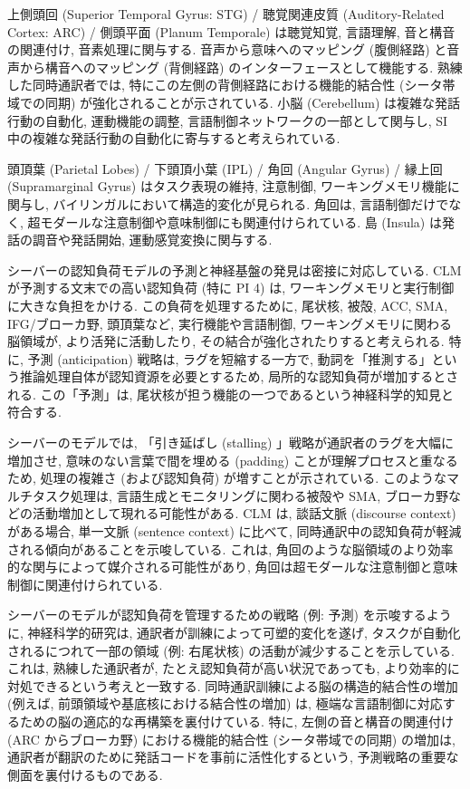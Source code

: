上側頭回 (Superior Temporal Gyrus: STG) / 聴覚関連皮質 (Auditory-Related Cortex: ARC) / 側頭平面 (Planum Temporale) は聴覚知覚, 言語理解, 音と構音の関連付け, 音素処理に関与する.
音声から意味へのマッピング (腹側経路) と音声から構音へのマッピング (背側経路) のインターフェースとして機能する.
熟練した同時通訳者では, 特にこの左側の背側経路における機能的結合性 (シータ帯域での同期) が強化されることが示されている.
小脳 (Cerebellum) は複雑な発話行動の自動化, 運動機能の調整, 言語制御ネットワークの一部として関与し, SI 中の複雑な発話行動の自動化に寄与すると考えられている.

頭頂葉 (Parietal Lobes) / 下頭頂小葉 (IPL) / 角回 (Angular Gyrus) / 縁上回 (Supramarginal Gyrus) はタスク表現の維持, 注意制御, ワーキングメモリ機能に関与し, バイリンガルにおいて構造的変化が見られる.
角回は, 言語制御だけでなく, 超モダールな注意制御や意味制御にも関連付けられている.
島 (Insula) は発話の調音や発話開始, 運動感覚変換に関与する.

シーバーの認知負荷モデルの予測と神経基盤の発見は密接に対応している.
CLM が予測する文末での高い認知負荷 (特に PI 4) は, ワーキングメモリと実行制御に大きな負担をかける.
この負荷を処理するために, 尾状核, 被殻, ACC, SMA, IFG/ブローカ野, 頭頂葉など, 実行機能や言語制御, ワーキングメモリに関わる脳領域が, より活発に活動したり, その結合が強化されたりすると考えられる.
特に, 予測 (anticipation) 戦略は, ラグを短縮する一方で, 動詞を「推測する」という推論処理自体が認知資源を必要とするため, 局所的な認知負荷が増加するとされる.
この「予測」は, 尾状核が担う機能の一つであるという神経科学的知見と符合する.

シーバーのモデルでは, 「引き延ばし (stalling) 」戦略が通訳者のラグを大幅に増加させ, 意味のない言葉で間を埋める (padding) ことが理解プロセスと重なるため, 処理の複雑さ (および認知負荷) が増すことが示されている.
このようなマルチタスク処理は, 言語生成とモニタリングに関わる被殻や SMA, ブローカ野などの活動増加として現れる可能性がある.
CLM は, 談話文脈 (discourse context) がある場合, 単一文脈 (sentence context) に比べて, 同時通訳中の認知負荷が軽減される傾向があることを示唆している.
これは, 角回のような脳領域のより効率的な関与によって媒介される可能性があり, 角回は超モダールな注意制御と意味制御に関連付けられている.

シーバーのモデルが認知負荷を管理するための戦略 (例: 予測) を示唆するように, 神経科学的研究は, 通訳者が訓練によって可塑的変化を遂げ, タスクが自動化されるにつれて一部の領域 (例: 右尾状核) の活動が減少することを示している.
これは, 熟練した通訳者が, たとえ認知負荷が高い状況であっても, より効率的に対処できるという考えと一致する.
同時通訳訓練による脳の構造的結合性の増加 (例えば, 前頭領域や基底核における結合性の増加) は, 極端な言語制御に対応するための脳の適応的な再構築を裏付けている.
特に, 左側の音と構音の関連付け (ARC からブローカ野) における機能的結合性 (シータ帯域での同期) の増加は, 通訳者が翻訳のために発話コードを事前に活性化するという, 予測戦略の重要な側面を裏付けるものである.

